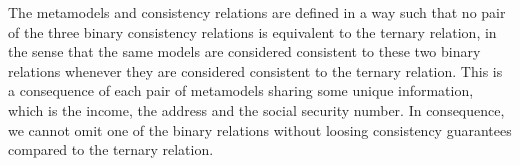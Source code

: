 The metamodels and consistency relations are defined in a way such that no pair of the three binary consistency relations is equivalent to the ternary relation, in the sense that the same models are considered consistent to these two binary relations whenever they are considered consistent to the ternary relation.
This is a consequence of each pair of metamodels sharing some unique information, which is the income, the address and the social security number.
In consequence, we cannot omit one of the binary relations without loosing consistency guarantees compared to the ternary relation.



    


